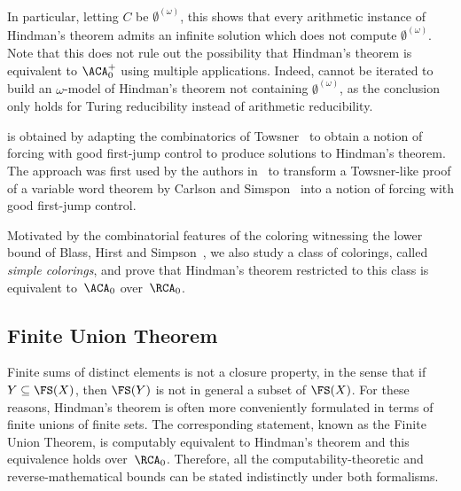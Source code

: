 \documentclass{article}
\numberwithin{theorem}{section}
\newtheorem{maintheorem}[theorem]{Main Theorem}
\begin{document}

In particular, letting $C$ be $\emptyset^{(\omega)}$, this shows that every arithmetic instance of Hindman's theorem admits an infinite solution which does not compute $\emptyset^{(\omega)}$.
Note that this does not rule out the possibility that Hindman's theorem is equivalent to $\ACA_0^+$ using multiple applications. Indeed,  cannot be iterated to build an $\omega$-model of Hindman's theorem not containing $\emptyset^{(\omega)}$, as the conclusion only holds for Turing reducibility instead of arithmetic reducibility.

 is obtained by adapting the combinatorics of Towsner~\cite{towsnerSimpleProofDifficult2012} to obtain a notion of forcing with good first-jump control to produce solutions to Hindman's theorem. The approach was first used by the authors in~\cite{liu2026reverse} to transform a Towsner-like proof of a variable word theorem by Carlson and Simspon~\cite{carlson1984dual} into a notion of forcing with good first-jump control.

Motivated by the combinatorial features of the coloring witnessing the lower bound of Blass, Hirst and Simpson~\cite{blassLogicalAnalysisTheorems1987}, we also study a class of colorings, called \emph{simple colorings}, and prove that Hindman's theorem restricted to this class is equivalent to~$\ACA_0$ over~$\RCA_0$.

\subsection{Finite Union Theorem}

Finite sums of distinct elements is not a closure property, in the sense that if $Y \subseteq \FS(X)$, then $\FS(Y)$ is not in general a subset of $\FS(X)$. For these reasons, Hindman's theorem is often more conveniently formulated in terms of finite unions of finite sets. The corresponding statement, known as the Finite Union Theorem, is computably equivalent to Hindman's theorem and this equivalence holds over~$\RCA_0$. Therefore, all the computability-theoretic and reverse-mathematical bounds can be stated indistinctly under both formalisms.
\end{document}
